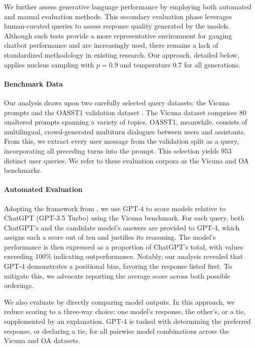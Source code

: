 We further assess generative language performance by employing both automated and manual evaluation methods. This secondary evaluation phase leverages human-curated queries to assess response quality generated by the models. Although such tests provide a more representative environment for gauging chatbot performance and are increasingly used, there remains a lack of standardized methodology in existing research. Our approach, detailed below, applies nucleus sampling with $p=0.9$ and temperature $0.7$ for all generations.

\paragraph{Benchmark Data} Our analysis draws upon two carefully selected query datasets: the Vicuna prompts \citep{vicuna2023} and the OASST1 validation dataset \citep{kopf2023openassistant}. The Vicuna dataset comprises 80 unaltered prompts spanning a variety of topics. OASST1, meanwhile, consists of multilingual, crowd-generated multiturn dialogues between users and assistants. From this, we extract every user message from the validation split as a query, incorporating all preceding turns into the prompt. This selection yields 953 distinct user queries. We refer to these evaluation corpora as the Vicuna and OA benchmarks.

\paragraph{Automated Evaluation} Adopting the framework from \citet{vicuna2023}, we use GPT-4 to score models relative to ChatGPT (GPT-3.5 Turbo) using the Vicuna benchmark. For each query, both ChatGPT’s and the candidate model’s answers are provided to GPT-4, which assigns each a score out of ten and justifies its reasoning. The model’s performance is then expressed as a proportion of ChatGPT's total, with values exceeding 100\% indicating outperformance. Notably, our analysis revealed that GPT-4 demonstrates a positional bias, favoring the response listed first. To mitigate this, we advocate reporting the average score across both possible orderings.

We also evaluate by directly comparing model outputs. In this approach, we reduce scoring to a three-way choice: one model’s response, the other’s, or a tie, supplemented by an explanation. GPT-4 is tasked with determining the preferred response, or declaring a tie, for all pairwise model combinations across the Vicuna and OA datasets.

